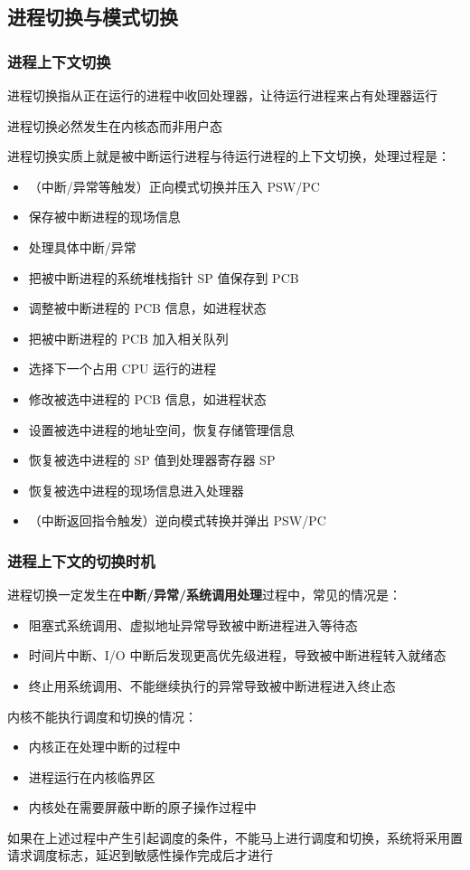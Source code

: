\documentclass[cs4size,a4paper,10pt]{ctexart}
\begin{document}
	\subsection{进程切换与模式切换}
	\subsubsection{进程上下文切换}
	进程切换指从正在运行的进程中收回处理器，让待运行进程来占有处理器运行

	进程切换必然发生在内核态而非用户态

	进程切换实质上就是被中断运行进程与待运行进程的上下文切换，处理过程是：
	\begin{itemize}
		\item （中断/异常等触发）正向模式切换并压入 PSW/PC
		\item 保存被中断进程的现场信息
		\item 处理具体中断/异常
		\item 把被中断进程的系统堆栈指针 SP 值保存到 PCB
		\item 调整被中断进程的 PCB 信息，如进程状态
		\item 把被中断进程的 PCB 加入相关队列
		\item 选择下一个占用 CPU 运行的进程
		\item 修改被选中进程的 PCB 信息，如进程状态
		\item 设置被选中进程的地址空间，恢复存储管理信息
		\item 恢复被选中进程的 SP 值到处理器寄存器 SP
		\item 恢复被选中进程的现场信息进入处理器
		\item （中断返回指令触发）逆向模式转换并弹出 PSW/PC
	\end{itemize}

	\subsubsection{进程上下文的切换时机}
	进程切换一定发生在\textbf{中断/异常/系统调用处理}过程中，常见的情况是：
	\begin{itemize}
		\item 阻塞式系统调用、虚拟地址异常导致被中断进程进入等待态
		\item 时间片中断、I/O 中断后发现更高优先级进程，导致被中断进程转入就绪态
		\item 终止用系统调用、不能继续执行的异常导致被中断进程进入终止态
	\end{itemize}
	内核不能执行调度和切换的情况：
	\begin{itemize}
		\item 内核正在处理中断的过程中
		\item 进程运行在内核临界区
		\item 内核处在需要屏蔽中断的原子操作过程中
	\end{itemize}
	如果在上述过程中产生引起调度的条件，不能马上进行调度和切换，系统将采用置请求调度标志，延迟到敏感性操作完成后才进行
\end{document}
